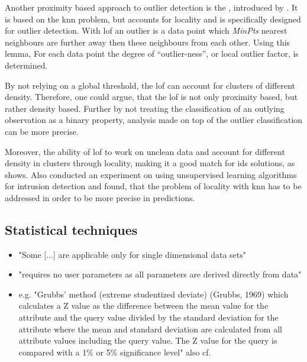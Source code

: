 Another proximity based approach to outlier detection is the , introduced by \textcite{Breunig2000}. It is based on the \gls{knn} problem, but accounts for locality and is specifically designed for outlier detection.
With \gls{lof} an outlier is a data point which \emph{MinPts} nearest neighbours are further away then these neighbours from each other. 
Using this lemma, For each data point the degree of \enquote{outlier-ness}, or local outlier factor, is determined.

By not relying on a global threshold, the \gls{lof} can account for clusters of different density. Therefore, one could argue, that the \gls{lof} is not only proximity based, but rather density based. Further by not treating the classification of an outlying observation as a binary property, analysis made on top of the outlier classification can be more precise. \parencite[cf.][]{Breunig2000}

Moreover, the ability of \gls{lof} to work on unclean data and account for different density in clusters through locality, making it a good match for \gls{ids} solutions, as \textcite{Lazarevic2003} shows. Also \textcite{Zanero2004} conducted an experiment on using unsupervised learning algorithms for intrusion detection and found, that the problem of locality with \gls{knn} has to be addressed in order to be more precise in predictions.


\subsection{Statistical techniques}
\label{sec:background:network:novelty:stat}
	
	\begin{itemize}
		\item "Some [...] are applicable only for single dimensional data sets" \parencite{Hodge2004}
		\item "requires no user parameters as all parameters are derived directly from data" \parencite{Hodge2004}
		\item e.g. "Grubbs’ method (extreme studentized deviate) (Grubbs, 1969) which calculates a Z value as the difference between the mean value for the attribute and the query value divided by the standard deviation for the attribute where the mean and standard deviation are calculated from all attribute values including the query value. The Z value for the query is compared with a 1\% or 5\% significance level" \parencite{Hodge2004} also cf. \textcite{Grubbs1969}
	\end{itemize}
	
